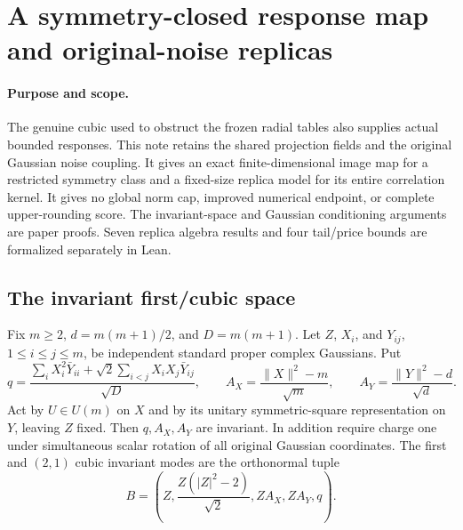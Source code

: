 \section{A symmetry-closed response map and original-noise replicas}\label{sec:ms-symmetric-replicas}
\paragraph{Purpose and scope.}
The genuine cubic used to obstruct the frozen radial tables also supplies
actual bounded responses. This note retains the shared projection fields and
the original Gaussian noise coupling. It gives an exact finite-dimensional
image map for a restricted symmetry class and a fixed-size replica model for
its entire correlation kernel. It gives no global norm cap, improved numerical
endpoint, or complete upper-rounding score. The invariant-space and Gaussian
conditioning arguments are paper proofs. Seven replica algebra results and
four tail/price bounds are formalized separately in Lean.

\subsection{The invariant first/cubic space}
Fix $m\ge2$, $d=m(m+1)/2$, and $D=m(m+1)$. Let $Z$, $X_i$, and $Y_{ij}$,
$1\le i\le j\le m$, be independent standard proper complex Gaussians. Put
\[
 q=\frac{\sum_i X_i^2\bar Y_{ii}
          +\sqrt2\sum_{i<j}X_iX_j\bar Y_{ij}}{\sqrt D},\qquad
 A_X=\frac{\|X\|^2-m}{\sqrt m},\qquad
 A_Y=\frac{\|Y\|^2-d}{\sqrt d}.
\]
Act by $U\in U(m)$ on $X$ and by its unitary symmetric-square representation
on $Y$, leaving $Z$ fixed. Then $q,A_X,A_Y$ are invariant. In addition require
charge one under simultaneous scalar rotation of all original Gaussian
coordinates. The first and $(2,1)$ cubic invariant modes are the orthonormal tuple
\begin{equation}\label{eq:five-modes}
 B=\left(Z,\frac{Z(|Z|^2-2)}{\sqrt2},ZA_X,ZA_Y,q\right).
\end{equation}


